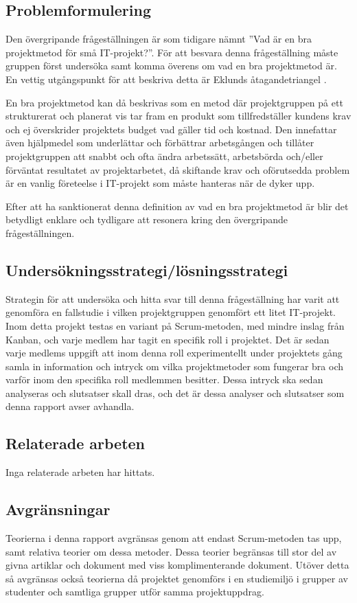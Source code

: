 \documentclass[conference,a4paper]{IEEEtran}
\begin{document}
\subsection{Problemformulering}
Den övergripande frågeställningen är som tidigare nämnt ''Vad är en bra projektmetod för små IT-projekt?''. För att besvara denna frågeställning måste gruppen först undersöka samt komma överens om vad en bra projektmetod är. En vettig utgångspunkt för att beskriva detta är Eklunds åtagandetriangel \cite[s. 128-129]{Eklund14}.

En bra projektmetod kan då beskrivas som en metod där projektgruppen på ett strukturerat och planerat vis tar fram en produkt som tillfredställer kundens krav och ej överskrider projektets budget vad gäller tid och kostnad. Den innefattar även hjälpmedel som underlättar och förbättrar arbetsgången och tillåter projektgruppen att snabbt och ofta ändra arbetssätt, arbetsbörda och/eller förväntat resultatet av projektarbetet, då skiftande krav och oförutsedda problem är en vanlig företeelse i IT-projekt som måste hanteras när de dyker upp.

Efter att ha sanktionerat denna definition av vad en bra projektmetod är blir det betydligt enklare och tydligare att resonera kring den övergripande frågeställningen.
\subsection{Undersökningsstrategi/lösningsstrategi}
Strategin för att undersöka och hitta svar till denna frågeställning har varit att genomföra en fallstudie i vilken projektgruppen genomfört ett litet IT-projekt. Inom detta projekt testas en variant på Scrum-metoden, med mindre inslag från Kanban, och varje medlem har tagit en specifik roll i projektet. Det är sedan varje medlems uppgift att inom denna roll experimentellt under projektets gång samla in information och intryck om vilka projektmetoder som fungerar bra och varför inom den specifika roll medlemmen besitter. Dessa intryck ska sedan analyseras och slutsatser skall dras, och det är dessa analyser och slutsatser som denna rapport avser avhandla.

\subsection{Relaterade arbeten}
Inga relaterade arbeten har hittats.

\subsection{Avgränsningar}
Teorierna i denna rapport avgränsas genom att endast Scrum-metoden tas upp, samt relativa teorier om dessa metoder. Dessa teorier begränsas till stor del av givna artiklar och dokument med viss komplimenterande dokument. Utöver detta så avgränsas också teorierna då projektet genomförs i en studiemiljö i grupper av studenter och samtliga grupper utför samma projektuppdrag.
\end{document}
